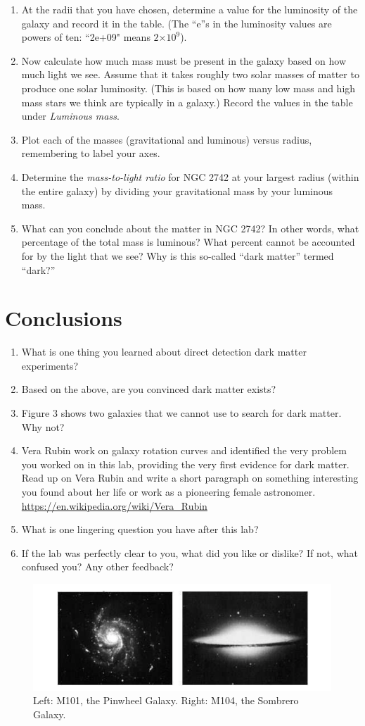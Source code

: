 \documentclass[11pt]{article}%
\providecommand{\e}[1]{\ensuremath{\times 10^{#1}}} %
\begin{document}
\begin{enumerate}[resume]
\item At the radii that you have chosen, determine a value for the luminosity of the galaxy and record it in the table. (The ``e''s in the luminosity values are powers of ten: ``2e+09" means $2 \e{9}$).
\item Now calculate how much mass must be present in the galaxy based on how much light we see. Assume that it takes roughly two solar masses of matter to produce one solar luminosity. (This is based on how many low mass and high mass stars we think are typically in a galaxy.) Record the values in the table under \textit{Luminous mass}. 
\item Plot each of the masses (gravitational and luminous) versus radius, remembering to label your axes.
\item Determine the \textit{mass-to-light ratio} for NGC 2742 at your largest radius (within the entire galaxy) by dividing your gravitational mass by your luminous mass. 
\item What can you conclude about the matter in NGC 2742? 
In other words, what percentage of the total mass is luminous? 
What percent cannot be accounted for by the light that we see?
Why is this so-called ``dark matter'' termed ``dark?''
\end{enumerate}

\section{Conclusions}
\begin{enumerate}

\item What is one thing you learned about direct detection dark matter experiments?
\item Based on the above, are you convinced dark matter exists?
\item Figure 3 shows two galaxies that we cannot use to search for dark matter. Why not?
\item Vera Rubin work on galaxy rotation curves and identified the very problem you worked on in this lab, providing the very first evidence for dark matter.  Read up on Vera Rubin and write a short paragraph on something interesting you found about her life or work as a pioneering female astronomer. \url{https://en.wikipedia.org/wiki/Vera_Rubin}
\item What is one lingering question you have after this lab?
\item If the lab was perfectly clear to you, what did you like or dislike? If not, what confused you? Any other feedback?
\end{enumerate}

\begin{figure}[t!]
\center
\includegraphics[scale=0.6]{Images/galaxies.png}
\caption{Left: M101, the Pinwheel Galaxy. Right: M104, the Sombrero Galaxy.}
\label{galaxies}
\end{figure}
\end{document}
